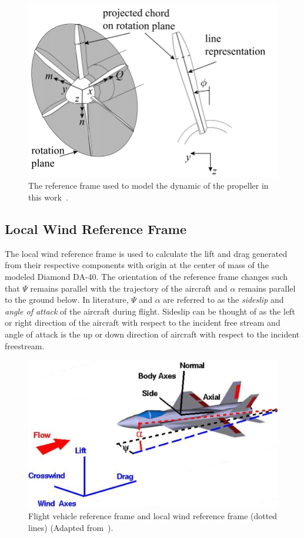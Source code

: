 \begin{figure}[!ht]
    \centering
    \includegraphics[width=0.75\linewidth]{Figures/propframe.png}
    \caption{The reference frame used to model the dynamic of the propeller in this work~\cite{vanarnhemEngineeringMethodEstimate2020}.}\label{fig:propframe}
\end{figure}

\subsection{\textbf{Local Wind Reference Frame}}
The local wind reference frame is used to calculate the lift and drag generated from their respective components with origin at the center of mass of the modeled Diamond DA-40. The orientation of the reference frame changes such that \(\Psi \) remains parallel with the trajectory of the aircraft and \(\alpha \) remains parallel to the ground below. In literature, \( \Psi \) and \(\alpha \) are referred to as the \textit{sideslip} and \textit{angle of attack} of the aircraft during flight. Sideslip can be thought of as the left or right direction of the aircraft with respect to the incident free stream and angle of attack is the up or down direction of aircraft with respect to the incident freestream.

\begin{figure}[!ht]
    \centering
    \includegraphics[width=0.75\linewidth]{Figures/windaxes.png}
    \caption{Flight vehicle reference frame and local wind reference frame (dotted lines) (Adapted from~\cite{ForceBalanceCoordinates1969}).}\label{fig:windframe}
\end{figure}


